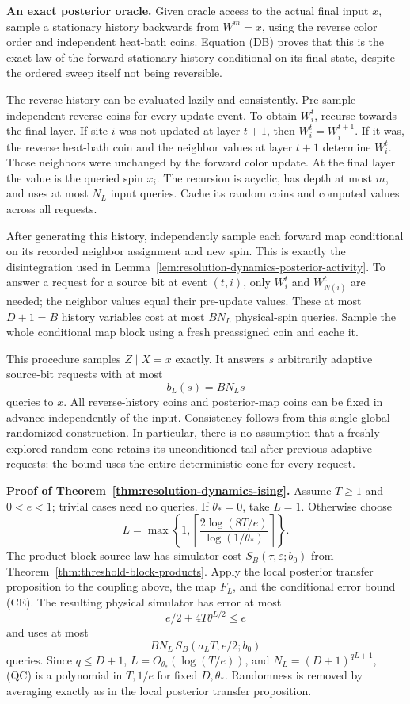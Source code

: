 \documentclass[11pt]{article}
\theoremstyle{definition}
\theoremstyle{remark}
\begin{document}
\textbf{An exact posterior oracle.}
Given oracle access to the actual final input \(x\), sample a
stationary history backwards from \(W^m=x\), using the reverse color
order and independent heat-bath coins. Equation (DB) proves that this
is the exact law of the forward stationary history conditional on its
final state, despite the ordered sweep itself not being reversible.

The reverse history can be evaluated lazily and consistently.
Pre-sample independent reverse coins for every update event. To obtain
\(W_i^t\), recurse towards the final layer. If site \(i\) was not
updated at layer \(t+1\), then \(W_i^t=W_i^{t+1}\). If it was,
the reverse heat-bath coin and the neighbor values at layer \(t+1\)
determine \(W_i^t\). Those neighbors were unchanged by the forward
color update. At the final layer the value is the queried spin
\(x_i\). The recursion is acyclic, has depth at most \(m\), and
uses at most \(N_L\) input queries. Cache its random coins and
computed values across all requests.

After generating this history, independently sample each forward map
conditional on its recorded neighbor assignment and new spin. This
is exactly the disintegration used in
Lemma~\ref{lem:resolution-dynamics-posterior-activity}. To answer a
request for a source bit at event \((t,i)\), only
\(W_i^t\) and \(W_{N(i)}^t\) are needed; the neighbor values equal
their pre-update values. These at most \(D+1=B\) history variables
cost at most \(BN_L\) physical-spin queries. Sample the whole
conditional map block using a fresh preassigned coin and cache it.

This procedure samples \(Z\mid X=x\) exactly. It answers \(s\)
arbitrarily adaptive source-bit requests with at most
\[
 b_L(s)=BN_Ls
\]
queries to \(x\). All reverse-history coins and posterior-map coins
can be fixed in advance independently of the input. Consistency follows
from this single global randomized construction. In particular, there
is no assumption that a freshly explored random cone retains its
unconditioned tail after previous adaptive requests: the bound uses
the entire deterministic cone for every request.

\textbf{Proof of Theorem~\ref{thm:resolution-dynamics-ising}.}
Assume \(T\ge1\) and \(0<e<1\); trivial cases need no queries.
If \(\theta_*=0\), take \(L=1\). Otherwise choose
\[
 L=\max\left\{1,
 \left\lceil\frac{2\log(8T/e)}{\log(1/\theta_*)}\right\rceil
 \right\}.
\]
The product-block source law has simulator cost
\(S_B(\tau,\varepsilon;b_0)\) from
Theorem~\ref{thm:threshold-block-products}. Apply the local posterior
transfer proposition to the coupling above, the map \(F_L\), and
the conditional error bound (CE). The resulting physical simulator
has error at most
\[
 e/2+4T\theta^{L/2}\le e
\]
and uses at most
\[
 B N_L\,S_B(a_LT,e/2;b_0)
 \tag{QC}
\]
queries. Since \(q\le D+1\), \(L=O_{\theta_*}(\log(T/e))\),
and \(N_L=(D+1)^{qL+1}\), (QC) is a polynomial in \(T,1/e\)
for fixed \(D,\theta_*\). Randomness is removed by averaging exactly
as in the local posterior transfer proposition.
\end{document}
